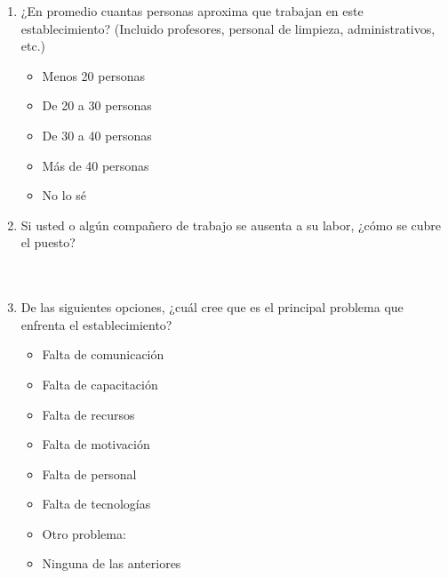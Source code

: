 \documentclass{article}
\begin{document}
\newpage
\begin{enumerate}
    \item ¿En promedio cuantas personas aproxima que trabajan en este establecimiento? (Incluido profesores, personal de limpieza, administrativos, etc.)
    \begin{itemize}[label=$\square$]
        \item Menos 20 personas
        \item De 20 a 30 personas
        \item De 30 a 40 personas
        \item Más de 40 personas
        \item No lo sé
    \end{itemize}
    \item Si usted o algún compañero de trabajo se ausenta a su labor, ¿cómo se cubre el puesto? \\[0.5cm]
    \underline{\hspace{0.95\linewidth}} \vspace{0.3cm} \\
    \underline{\hspace{0.95\linewidth}} \vspace{0.3cm} \\
    \underline{\hspace{0.95\linewidth}} \vspace{0.3cm}
    \item De las siguientes opciones, ¿cuál cree que es el principal problema que enfrenta el establecimiento?
    \begin{itemize}[label=$\square$]
        \item Falta de comunicación
        \item Falta de capacitación
        \item Falta de recursos
        \item Falta de motivación
        \item Falta de personal
        \item Falta de tecnologías
        \item Otro problema: \underline{\hspace{0.5\linewidth}}
        \item Ninguna de las anteriores
    \end{itemize}
\end{enumerate}
\end{document}
